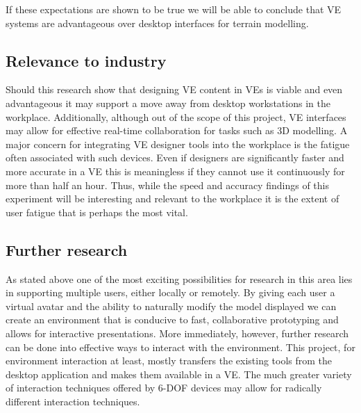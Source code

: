 \documentclass{sig-alternate-05-2015}
\begin{document}
If these expectations are shown to be true we will be able to conclude that VE systems are advantageous over desktop interfaces for terrain modelling. 
\subsection{Relevance to industry}
Should this research show that designing VE content in VEs is viable and even advantageous it may support a move away from desktop workstations in the workplace. Additionally, although out of the scope of this project, VE interfaces may allow for effective real-time collaboration for tasks such as 3D modelling. A major concern for integrating VE designer tools into the workplace is the fatigue often associated with such devices. Even if designers are significantly faster and  more accurate in a VE this is meaningless if they cannot use it continuously for more than half an hour. Thus, while the speed and accuracy findings of this experiment will be interesting and relevant to the workplace it is the extent of user fatigue that is perhaps the most vital.
\subsection{Further research}
As stated above one of the most exciting possibilities for research in this area lies in supporting multiple users, either locally or remotely. By giving each user a virtual avatar and the ability to naturally modify the model displayed we can create an environment that is conducive to fast, collaborative prototyping and allows for interactive presentations.
More immediately, however, further research can be done into effective ways to interact with the environment. This project, for environment interaction at least, mostly transfers the existing tools from the desktop application and makes them available in a VE. The much greater variety of interaction techniques offered by 6-DOF devices may allow for radically different interaction techniques.
\newpage


\end{document}

